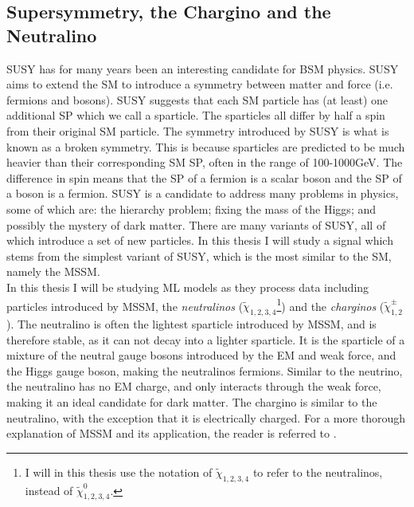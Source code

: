 \subsection{Supersymmetry, the Chargino and the Neutralino}\label{subsec:SS}
\acf{SUSY} has for many years been an interesting candidate for \ac{BSM} physics. 
\ac{SUSY} aims to extend the \ac{SM} to introduce a symmetry between matter and force (i.e. fermions and bosons). 
\ac{SUSY} suggests that each \ac{SM} particle has (at least) one additional \ac{SP} which we call a sparticle. 
The sparticles all differ by half a spin from their original \ac{SM} particle. The symmetry introduced by \ac{SUSY} is what 
is known as a broken symmetry. This is because sparticles are predicted to be much heavier than their corresponding \ac{SM} \ac{SP}, 
often in the range of 100-1000GeV. The difference in spin means that the \ac{SP} of a fermion is a scalar boson and the \ac{SP} 
of a boson is a fermion. \ac{SUSY} is a candidate to address many problems in physics, some of which are: the hierarchy problem; fixing 
the mass of the Higgs; and possibly the mystery of dark matter. There are many variants of \ac{SUSY}, all of which introduce a set 
of new particles. In this thesis I will study a signal which stems from the simplest variant of \ac{SUSY}, which is the most 
similar to the \ac{SM}, namely the \ac{MSSM}. 
\\
In this thesis I will be studying \ac{ML} models as they process data including particles introduced by \ac{MSSM}, the \emph{neutralinos} ($\tilde{\chi}_{1,2,3,4}$\footnote{I will in this thesis 
use the notation of $\tilde{\chi}_{1,2,3,4}$ to refer to the neutralinos, instead of $\tilde{\chi}^0_{1,2,3,4}$.}) and 
the \emph{charginos} ($\tilde{\chi}^{\pm}_{1,2}$). The neutralino is often the lightest sparticle introduced by \ac{MSSM}, and is therefore stable, as it can not decay into a lighter sparticle. 
It is the sparticle of a mixture of the neutral gauge bosons introduced by the \ac{EM} and weak force, and the Higgs gauge boson, making the neutralinos  
fermions. Similar to the neutrino, the neutralino has no \ac{EM} charge, and only interacts through the weak force, making it an ideal candidate 
for dark matter. The chargino is similar to the neutralino, with the exception that it is electrically charged. 
For a more thorough explanation of \ac{MSSM} and its application, the reader is referred to \cite{SUSY}. 